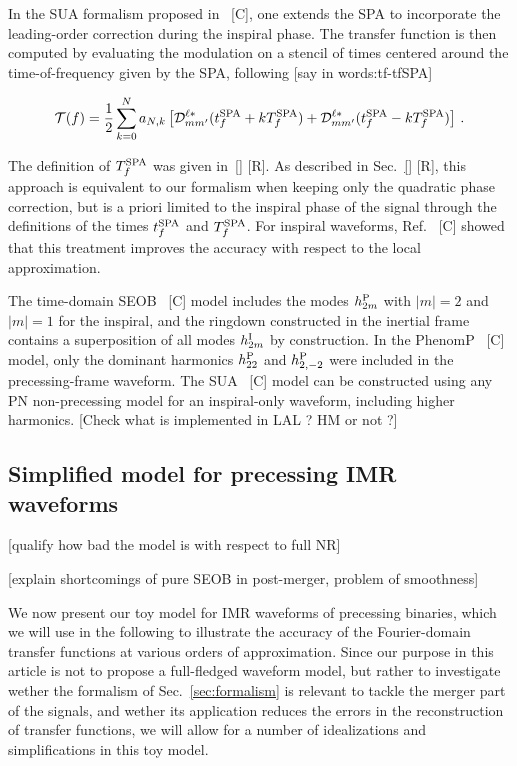 \documentclass[aps,showpacs,twocolumn,
prd,superscriptaddress,nofootinbib]{revtex4-1}
\newcommand{\be}{\begin{equation}}
\newcommand{\ee}{\end{equation}}
\newcommand\calT{{\mathcal{T}}}
\newcommand\calD{{\mathcal{D}}}
\newcommand{\Tf}{T_{f}}
\newcommand{\tfSPA}{t_{f}^{\rm SPA}}
\newcommand{\SM}[1]{{\color{Red} #1}}
\begin{document}
In the SUA formalism proposed in~\cite{} \SM{[C]}, one extends the SPA to incorporate the leading-order correction during the inspiral phase. The transfer function is then computed by evaluating the modulation on a stencil of times centered around the time-of-frequency given by the SPA, following \SM{[say in words:tf-tfSPA]} 
\begin{widetext}
\be
	\calT(f) = \frac{1}{2} \sum\limits_{k=0}^{N} a_{N,k} \left[\calD^{\ell *}_{mm'}(\tfSPA + k \Tf^{\rm SPA}) + \calD^{\ell *}_{mm'}(\tfSPA - k \Tf^{\rm SPA}) \right] \,.
\ee
\end{widetext}
The definition of $\Tf^{\rm SPA}$ was given in~\ref{} \SM{[R]}. As described in Sec.~\ref{} \SM{[R]}, this approach is equivalent to our formalism when keeping only the quadratic phase correction, but is a priori limited to the inspiral phase of the signal through the definitions of the times $t^{\rm SPA}_{f}$ and $T^{\rm SPA}_{f}$. For inspiral waveforms, Ref.~\cite{} \SM{[C]} showed that this treatment improves the accuracy with respect to the local approximation.

The time-domain SEOB~\cite{} \SM{[C]} model includes the modes $h^{\rm P}_{2m}$ with $|m|=2$ and $|m|=1$ for the inspiral, and the ringdown constructed in the inertial frame contains a superposition of all modes $h^{\rm I}_{2 m}$ by construction. In the PhenomP~\cite{} \SM{[C]} model, only the dominant harmonics $h^{\rm P}_{22}$ and $h^{\rm P}_{2,-2}$ were included in the precessing-frame waveform. The SUA~\cite{} \SM{[C]} model can be constructed using any PN non-precessing model for an inspiral-only waveform, including higher harmonics. \SM{[Check what is implemented in LAL ? HM or not ?]}

\subsection{Simplified model for precessing IMR waveforms}
\label{subsec:precmodel}

\SM{[qualify how bad the model is with respect to full NR]}

\SM{[explain shortcomings of pure SEOB in post-merger, problem of smoothness]}

We now present our toy model for IMR waveforms of precessing binaries, which we will use in the following to illustrate the accuracy of the Fourier-domain transfer functions at various orders of approximation. Since our purpose in this article is not to propose a full-fledged waveform model, but rather to investigate wether the formalism of Sec.~\ref{sec:formalism} is relevant to tackle the merger part of the signals, and wether its application reduces the errors in the reconstruction of transfer functions, we will allow for a number of idealizations and simplifications in this toy model.
\end{document}
